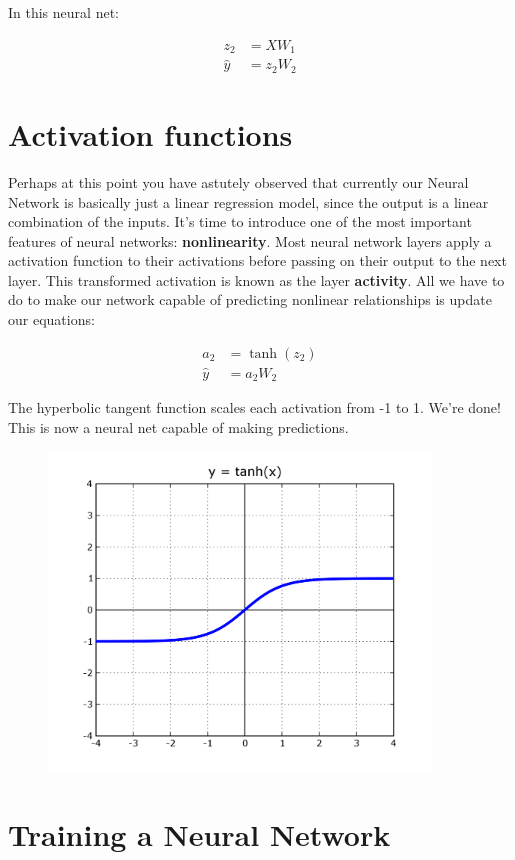 \documentclass[]{article}
\begin{document}
In this neural net:

\begin{align}
	z_2 &= X W_1\\
	\hat{y} &= z_2 W_2
\end{align}

\section{Activation functions}

Perhaps at this point you have astutely observed that currently our Neural Network is basically just a linear regression model, since the output is a linear combination of the inputs. It's time to introduce one of the most important features of neural networks: \textbf{nonlinearity}. Most neural network layers apply a activation function to their activations before passing on their output to the next layer. This transformed activation is known as the layer \textbf{activity}. All we have to do to make our network capable of predicting nonlinear relationships is update our equations:

\begin{align}
	a_2 &= \tanh (z_2) \\
	\hat{y} &= a_2 W_2
\end{align}

The hyperbolic tangent function scales each activation from -1 to 1. We're done! This is now a neural net capable of making predictions.

\begin{figure}[H]
\includegraphics[width=4in]{tanh.png}
\centering
\end{figure}


\section{Training a Neural Network}
\end{document}
